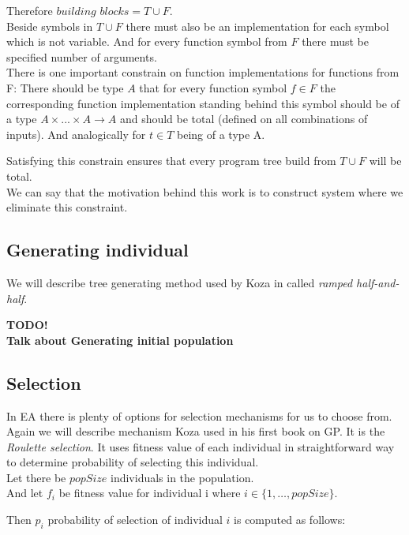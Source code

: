\documentclass[12pt,a4paper]{report}
\newcommand{\EA}{EA\xspace} %
\newcommand{\setDots}[2]{ 
	\lbrace #1 , \dots , #2 \rbrace
}
\begin{document}
Therefore $building$ $blocks = T \cup F$.\\

Beside symbols in $T \cup F$ there must also be 
an implementation for each symbol which is not variable. 
And for every function symbol from $F$ there must be specified 
number of arguments.\\

There is one important constrain on function implementations for functions from F:
There should be type $A$ that for every function symbol $f \in F$ the corresponding function implementation standing behind this symbol should be of a type 
$A \times ... \times A \rightarrow A$ and should be total (defined on all
combinations of inputs). And analogically for $t \in T$ being of a type A.  

Satisfying this constrain ensures that every program tree build 
from $T \cup F$ will be total.\\

We can say that the motivation behind this work is to construct system where we
eliminate this constraint. 

\subsection{Generating individual}

We will describe tree generating method used by Koza in \cite{koza92} called
\textit{ramped half-and-half}. 

\textbf{TODO!}\\
\textbf{Talk about Generating initial population}

\subsection{Selection}

In \EA there is plenty of options for selection mechanisms 
for us to choose from. Again we will describe mechanism Koza
used in his first book on GP. It is the \textit{Roulette selection}.
It uses fitness value of each individual in straightforward way to determine probability of selecting this individual.\\

Let there be $popSize$ individuals in the population.\\
And let $f_{i}$ be fitness value for individual i 
where $i \in \setDots{1}{popSize}$. 

Then $p_{i}$ probability of selection of individual $i$ is computed
as follows:
\end{document}
